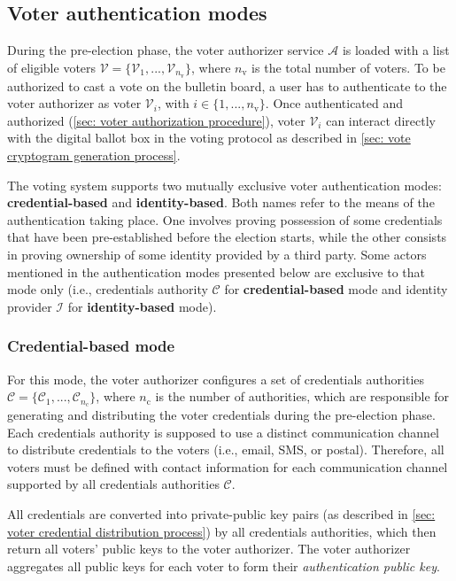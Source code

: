 \subsection{Voter authentication modes} \label{sec: voter authentication modes}
During the pre-election phase, the voter authorizer service $\mathcal{A}$ is loaded with a list of eligible voters $\boldsymbol{\mathcal{V}} = \{ \mathcal{V}_1, ..., \mathcal{V}_{n_\mathrm{v}} \}$, where $n_\mathrm{v}$ is the total number of voters. To be authorized to cast a vote on the bulletin board, a user has to authenticate to the voter authorizer as voter $\mathcal{V}_i$, with $i \in \{ 1, ..., n_\mathrm{v} \}$. Once authenticated and authorized (\cref{sec: voter authorization procedure}), voter $\mathcal{V}_i$ can interact directly with the digital ballot box in the voting protocol as described in \cref{sec: vote cryptogram generation process}.

The voting system supports two mutually exclusive voter authentication modes: \textbf{credential-based} and \textbf{identity-based}. Both names refer to the means of the authentication taking place. One involves proving possession of some credentials that have been pre-established before the election starts, while the other consists in proving ownership of some identity provided by a third party. Some actors mentioned in the authentication modes presented below are exclusive to that mode only (i.e., credentials authority $\mathcal{C}$ for \textbf{credential-based} mode and identity provider $\mathcal{I}$ for \textbf{identity-based} mode).


\subsubsection{Credential-based mode} \label{sec: credential-based mode}
For this mode, the voter authorizer configures a set of credentials authorities $\boldsymbol{\mathcal{C}} = \{\mathcal{C}_1, ..., \mathcal{C}_{n_\mathrm{c}}\}$, where $n_\mathrm{c}$ is the number of authorities, which are responsible for generating and distributing the voter credentials during the pre-election phase. Each credentials authority is supposed to use a distinct communication channel to distribute credentials to the voters (i.e., email, SMS, or postal). Therefore, all voters must be defined with contact information for each communication channel supported by all credentials authorities $\boldsymbol{\mathcal{C}}$.

All credentials are converted into private-public key pairs (as described in \cref{sec: voter credential distribution process}) by all credentials authorities, which then return all voters' public keys to the voter authorizer. The voter authorizer aggregates all public keys for each voter to form their \textit{authentication public key}. 

